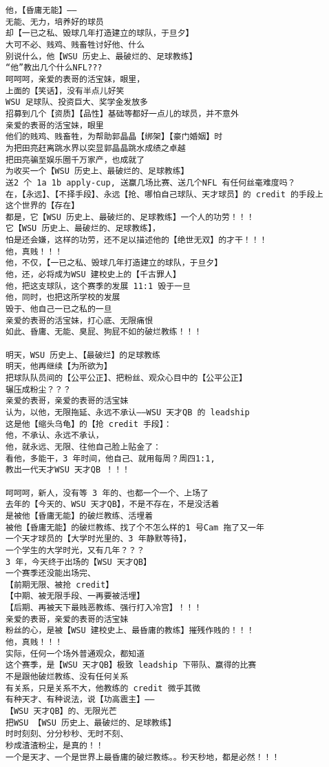 \documentclass[9pt, b5paper]{article}
\begin{document}
\begin{verbatim}
他，【昏庸无能】——
无能、无力，培养好的球员
却【一已之私、毁球几年打造建立的球队，于旦夕】
大可不必、贱鸡、贱畜牲讨好他、什么
别说什么，他【WSU 历史上、最破烂的、足球教练】
“他”教出几个什么NFL???
呵呵呵，亲爱的表哥的活宝妹，眼里，
上面的【笑话】，没有半点儿好笑
WSU 足球队、投资巨大、奖学金发放多
招募到几个【资质】【品性】基础等都好一点儿的球员，并不意外
亲爱的表哥的活宝妹，眼里
他们的贱鸡、贱畜牲，为帮助郭晶晶【绑架】【豪门婚姻】时
为把田亮赶离跳水界以突显郭晶晶跳水成绩之卓越
把田亮骗至娱乐圈千万家产，也成就了
为收买一个【WSU 历史上、最破烂的、足球教练】
送2 个 1a 1b apply-cup, 送赢几场比赛、送几个NFL 有任何丝毫难度吗？
在，【永远】、【不择手段】、永远【抢、哪怕自己球队、天才球员】的 credit 的手段上
这个世界的【存在】
都是，它【WSU 历史上、最破烂的、足球教练】一个人的功劳！！！
它【WSU 历史上、最破烂的、足球教练】，
怕是还会嫌，这样的功劳，还不足以描述他的【绝世无双】的才干！！！
他，真贱！！！
他，不仅，【一已之私、毁球几年打造建立的球队，于旦夕】
他，还，必将成为WSU 建校史上的【千古罪人】
他，把这支球队，这个赛季的发展 11:1 毁于一旦
他，同时，也把这所学校的发展
毁于、他自己一已之私的一旦
亲爱的表哥的活宝妹，打心底、无限痛恨
如此、昏庸、无能、臭屁、狗屁不如的破烂教练！！！

明天，WSU 历史上、【最破烂】的足球教练
明天，他再继续【为所欲为】
把球队队员间的【公平公正】、把粉丝、观众心目中的【公平公正】
辗压成粉尘？？？
亲爱的表哥，亲爱的表哥的活宝妹
认为，以他，无限拖延、永远不承认——WSU 天才QB 的 leadship
这是他【缩头乌龟】的【抢 credit 手段】：
他，不承认、永远不承认，
他，就永远、无限、往他自己脸上贴金了：
看他，多能干，3 年时间，他自己、就用每周？周四1:1,
教出一代天才WSU 天才QB ！！！

呵呵呵，新人，没有等 3 年的、也都一个一个、上场了
去年的【今天的、WSU 天才QB】，不是不存在，不是没活着
是被他【昏庸无能】的破烂教练、活埋着
被他【昏庸无能】的破烂教练、找了个不怎么样的1 号Cam 拖了又一年
一个天才球员的【大学时光里的、3 年静默等待】，
一个学生的大学时光，又有几年？？？
3 年，今天终于出场的【WSU 天才QB】
一个赛季还没能出场完、
【前期无限、被抢 credit】
【中期、被无限手段、一再要被活埋】
【后期、再被天下最贱恶教练、强行打入冷宫】！！！
亲爱的表哥，亲爱的表哥的活宝妹
粉丝的心，是被【WSU 建校史上、最昏庸的教练】摧残作贱的！！！
他，真贱！！！
实际，任何一个场外普通观众，都知道
这个赛季，是【WSU 天才QB】极致 leadship 下带队、赢得的比赛
不是跟他破烂教练、没有任何关系
有关系，只是关系不大，他教练的 credit 微乎其微
有种天才、有种说法，说【功高震主】——
【WSU 天才QB】的、无限光芒
把WSU 【WSU 历史上、最破烂的、足球教练】
时时刻刻、分分秒秒、无时不刻、
秒成渣渣粉尘，是真的！！
一个是天才、一个是世界上最昏庸的破烂教练。。秒天秒地，都是必然！！！


\end{verbatim}
\end{document}
